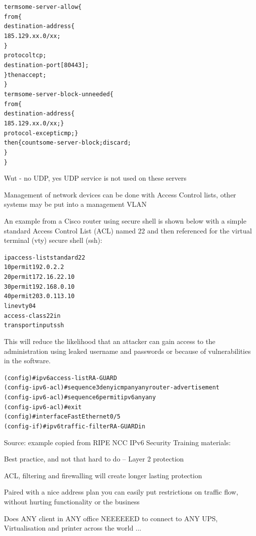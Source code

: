 \documentclass[Screen16to9,17pt]{foils}
\begin{document}

\begin{alltt}\footnotesize
term some-server-allow \{
    from \{
        destination-address \{
            185.129.xx.0/xx;
        \}
        protocol tcp;
        destination-port [ 80 443 ];
    \} then accept;
\}
term some-server-block-unneeded \{
    from \{
        destination-address \{
            185.129.xx.0/xx; \}
        protocol-except icmp;  \}
    then \{ count some-server-block; discard;
    \}
\}
\end{alltt}

Wut - no UDP, yes UDP service is not used on these servers


Management of network devices can be done with Access Control lists, other systems may be put into a management VLAN

An example from a Cisco router using secure shell is shown below with a simple standard Access Control List (ACL) named 22 and then referenced for the virtual terminal (vty) secure shell (ssh):

\begin{alltt}\scriptsize
ip access-list standard 22
10 permit 192.0.2.2
20 permit 172.16.22.10
30 permit 192.168.0.10
40 permit 203.0.113.10
line vty 0 4
  access-class 22 in
  transport input ssh
\end{alltt}

This will reduce the likelihood that an attacker can gain access to the administration using leaked username and passwords or because of vulnerabilities in the software.


\begin{alltt}\small
 (config)#ipv6 access-list RA-GUARD
 (config-ipv6-acl)#sequence 3 deny icmp any any router-advertisement
 (config-ipv6-acl)#sequence 6 permit ipv6 any any
 (config-ipv6-acl)#exit
 (config)#interface FastEthernet0/5
 (config-if)#ipv6 traffic-filter RA-GUARD in
\end{alltt}
Source: example copied from RIPE NCC IPv6 Security Training materials:\\

\begin{list2}
\item Best practice, and not that hard to do -- Layer 2 protection
\item ACL, filtering and firewalling will create longer lasting protection
\item Paired with a nice address plan you can easily put restrictions on traffic flow, without hurting functionality or the business
\item Does ANY client in ANY office NEEEEEED to connect to ANY UPS, Virtualisation and printer across the world ...
\end{list2}
\end{document}
